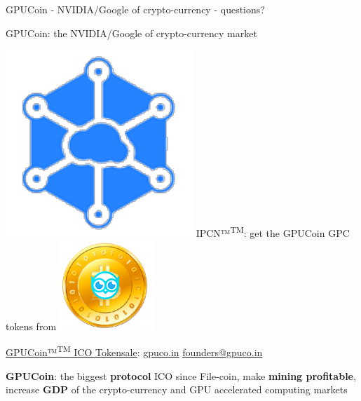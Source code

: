 \documentclass[10pt,handout]{beamer}
\begin{document}
\begin{frame}[standout]{GPUCoin - NVIDIA/Google of crypto-currency - questions?}
\begin{center}
GPUCoin: the NVIDIA/Google of crypto-currency market 
\end{center}


\includegraphics[scale=.3]{static/ipcn-p2p}
IPCN™\textsuperscript{TM}: get the GPUCoin GPC tokens from
\includegraphics[scale=0.3]{static/hootcoin} 


 \begin{center}
\href{https://j.mp/GPUCoins}{GPUCoin™\textsuperscript{TM} ICO Tokensale}: 
\href{http://gpuco.in}{gpuco.in}
\href{mailto:founders@gpuco.in}{founders@gpuco.in} 
 \end{center}
\begin{center}

\textbf{GPUCoin}: the biggest \textbf{protocol} ICO since File-coin, make \textbf{mining profitable}, increase \textbf{GDP} of the crypto-currency and GPU accelerated computing markets
\end{center}




 \begin{center}\ccbysa\end{center}

\end{frame}
\end{document}
